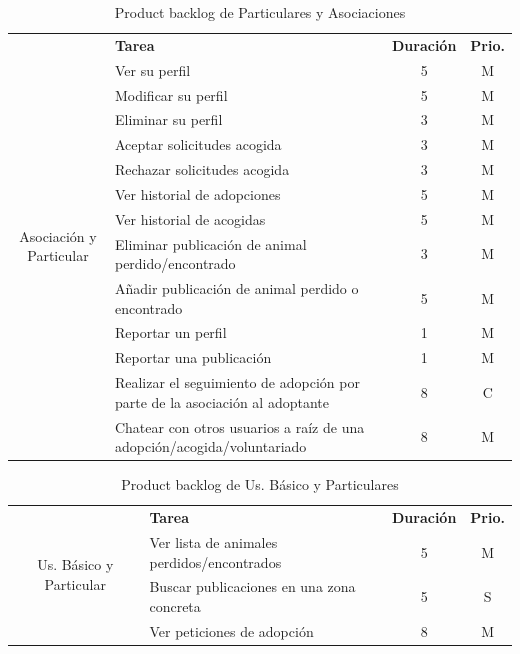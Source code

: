 \begin{table}[H]
	\centering
	\begin{tabular}{|c |p{8cm}|c |c|} \hline 
		\multirow[c]{16}{2cm}{Asociación y Particular}&  \textbf{Tarea}&  \textbf{Duración}& \textbf{Prio.}\\  \cline{2-4}
		
		&  Ver su perfil &  5& M\\ \cline{2-4}
		&  Modificar su perfil &  5& M\\ \cline{2-4}
		&  Eliminar su perfil &  3& M\\ \cline{2-4}
		
		&  Aceptar solicitudes acogida&  3& M\\ \cline{2-4}
		&  Rechazar solicitudes acogida&  3& M\\ \cline{2-4}
		
		&  Ver historial de adopciones &  5& M\\ \cline{2-4}
		&  Ver historial de acogidas &  5& M\\ \cline{2-4}
		&  Eliminar publicación de animal perdido/encontrado &  3& M\\ \cline{2-4}
		
		& Añadir publicación de animal perdido o encontrado & 5 & M \\ \cline{2-4}
		
		
		&  Reportar un perfil &  1& M\\ \cline{2-4}
		&  Reportar una publicación &  1& M\\ \cline{2-4}
		
		&  Realizar el seguimiento de adopción por parte de la asociación al adoptante&  8& C\\ \cline{2-4}
		
		&  Chatear con otros usuarios a raíz de una adopción/acogida/voluntariado &  8& M\\ \hline
		
		
		
	\end{tabular}
	\caption{Product backlog de Particulares y Asociaciones}
	\label{tab:pb_aso_particular}
\end{table}

\begin{table}[H]
	\centering
	\begin{tabular}{|c |p{8cm}|c |c|} \hline 
		\multirow[c]{4}{2cm}{Us. Básico y Particular}&  \textbf{Tarea}&  \textbf{Duración}& \textbf{Prio.}\\  \cline{2-4}
		& Ver lista de animales perdidos/encontrados & 5 & M \\ \cline{2-4}
		&  Buscar publicaciones en una zona concreta&  5& S\\ \cline{2-4}		
		&  Ver peticiones de adopción&  8& M\\ \hline
		
		
		
	\end{tabular}
	\caption{Product backlog de Us. Básico y Particulares}
	\label{tab:pb_part_usBasico}
\end{table}

